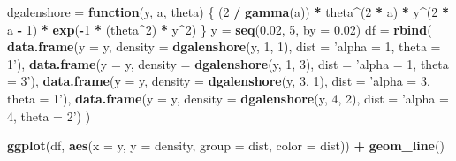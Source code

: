 \documentclass[]{article}
\newenvironment{Shaded}{\begin{snugshade}}{\end{snugshade}}
\newcommand{\ControlFlowTok}[1]{\textcolor[rgb]{0.13,0.29,0.53}{\textbf{#1}}}
\newcommand{\DataTypeTok}[1]{\textcolor[rgb]{0.13,0.29,0.53}{#1}}
\newcommand{\DecValTok}[1]{\textcolor[rgb]{0.00,0.00,0.81}{#1}}
\newcommand{\FloatTok}[1]{\textcolor[rgb]{0.00,0.00,0.81}{#1}}
\newcommand{\KeywordTok}[1]{\textcolor[rgb]{0.13,0.29,0.53}{\textbf{#1}}}
\newcommand{\NormalTok}[1]{#1}
\newcommand{\OperatorTok}[1]{\textcolor[rgb]{0.81,0.36,0.00}{\textbf{#1}}}
\newcommand{\StringTok}[1]{\textcolor[rgb]{0.31,0.60,0.02}{#1}}
\begin{document}
\begin{Shaded}
\begin{Highlighting}[]
\NormalTok{dgalenshore =}\StringTok{ }\ControlFlowTok{function}\NormalTok{(y, a, theta) \{}
\NormalTok{  (}\DecValTok{2} \OperatorTok{/}\StringTok{ }\KeywordTok{gamma}\NormalTok{(a)) }\OperatorTok{*}\StringTok{ }\NormalTok{theta}\OperatorTok{^}\NormalTok{(}\DecValTok{2} \OperatorTok{*}\StringTok{ }\NormalTok{a) }\OperatorTok{*}\StringTok{ }\NormalTok{y}\OperatorTok{^}\NormalTok{(}\DecValTok{2} \OperatorTok{*}\StringTok{ }\NormalTok{a }\OperatorTok{-}\StringTok{ }\DecValTok{1}\NormalTok{) }\OperatorTok{*}\StringTok{ }\KeywordTok{exp}\NormalTok{(}\OperatorTok{-}\DecValTok{1} \OperatorTok{*}\StringTok{ }\NormalTok{(theta}\OperatorTok{^}\DecValTok{2}\NormalTok{) }\OperatorTok{*}\StringTok{ }\NormalTok{y}\OperatorTok{^}\DecValTok{2}\NormalTok{)}
\NormalTok{\}}
\NormalTok{y =}\StringTok{ }\KeywordTok{seq}\NormalTok{(}\FloatTok{0.02}\NormalTok{, }\DecValTok{5}\NormalTok{, }\DataTypeTok{by =} \FloatTok{0.02}\NormalTok{)}
\NormalTok{df =}\StringTok{ }\KeywordTok{rbind}\NormalTok{(}
  \KeywordTok{data.frame}\NormalTok{(}\DataTypeTok{y =}\NormalTok{ y, }\DataTypeTok{density =} \KeywordTok{dgalenshore}\NormalTok{(y, }\DecValTok{1}\NormalTok{, }\DecValTok{1}\NormalTok{), }\DataTypeTok{dist =} \StringTok{'alpha = 1, theta = 1'}\NormalTok{),}
  \KeywordTok{data.frame}\NormalTok{(}\DataTypeTok{y =}\NormalTok{ y, }\DataTypeTok{density =} \KeywordTok{dgalenshore}\NormalTok{(y, }\DecValTok{1}\NormalTok{, }\DecValTok{3}\NormalTok{), }\DataTypeTok{dist =} \StringTok{'alpha = 1, theta = 3'}\NormalTok{),}
  \KeywordTok{data.frame}\NormalTok{(}\DataTypeTok{y =}\NormalTok{ y, }\DataTypeTok{density =} \KeywordTok{dgalenshore}\NormalTok{(y, }\DecValTok{3}\NormalTok{, }\DecValTok{1}\NormalTok{), }\DataTypeTok{dist =} \StringTok{'alpha = 3, theta = 1'}\NormalTok{),}
  \KeywordTok{data.frame}\NormalTok{(}\DataTypeTok{y =}\NormalTok{ y, }\DataTypeTok{density =} \KeywordTok{dgalenshore}\NormalTok{(y, }\DecValTok{4}\NormalTok{, }\DecValTok{2}\NormalTok{), }\DataTypeTok{dist =} \StringTok{'alpha = 4, theta = 2'}\NormalTok{)}
\NormalTok{)}

\KeywordTok{ggplot}\NormalTok{(df, }\KeywordTok{aes}\NormalTok{(}\DataTypeTok{x =}\NormalTok{ y, }\DataTypeTok{y =}\NormalTok{ density, }\DataTypeTok{group =}\NormalTok{ dist, }\DataTypeTok{color =}\NormalTok{ dist)) }\OperatorTok{+}
\StringTok{  }\KeywordTok{geom_line}\NormalTok{()}
\end{Highlighting}
\end{Shaded}
\end{document}
